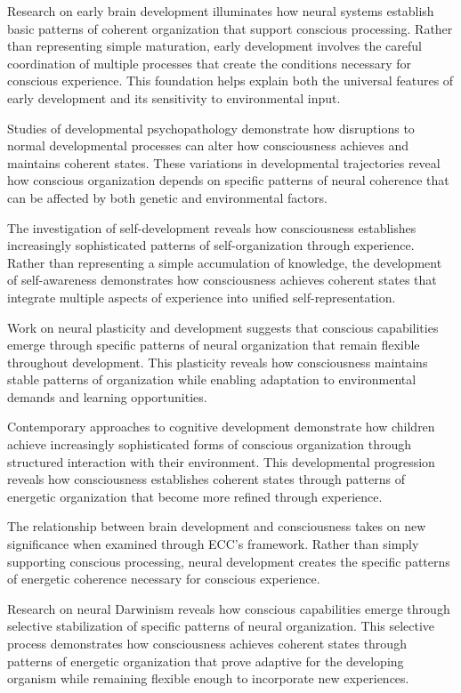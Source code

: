 \begin{refsection}
Research on early brain development \cite{DehaeneLambertz2015} illuminates how neural systems establish basic patterns of coherent organization that support conscious processing. Rather than representing simple maturation, early development involves the careful coordination of multiple processes that create the conditions necessary for conscious experience. This foundation helps explain both the universal features of early development and its sensitivity to environmental input.

Studies of developmental psychopathology \cite{Cicchetti2016} demonstrate how disruptions to normal developmental processes can alter how consciousness achieves and maintains coherent states. These variations in developmental trajectories reveal how conscious organization depends on specific patterns of neural coherence that can be affected by both genetic and environmental factors.

The investigation of self-development \cite{Damasio2010} reveals how consciousness establishes increasingly sophisticated patterns of self-organization through experience. Rather than representing a simple accumulation of knowledge, the development of self-awareness demonstrates how consciousness achieves coherent states that integrate multiple aspects of experience into unified self-representation.

Work on neural plasticity and development \cite{Nelson2021} suggests that conscious capabilities emerge through specific patterns of neural organization that remain flexible throughout development. This plasticity reveals how consciousness maintains stable patterns of organization while enabling adaptation to environmental demands and learning opportunities.

Contemporary approaches to cognitive development \cite{Carey2009} demonstrate how children achieve increasingly sophisticated forms of conscious organization through structured interaction with their environment. This developmental progression reveals how consciousness establishes coherent states through patterns of energetic organization that become more refined through experience.

The relationship between brain development and consciousness \cite{Johnson2011} takes on new significance when examined through ECC's framework. Rather than simply supporting conscious processing, neural development creates the specific patterns of energetic coherence necessary for conscious experience.

Research on neural Darwinism \cite{Edelman1987} reveals how conscious capabilities emerge through selective stabilization of specific patterns of neural organization. This selective process demonstrates how consciousness achieves coherent states through patterns of energetic organization that prove adaptive for the developing organism while remaining flexible enough to incorporate new experiences.


\end{refsection}
